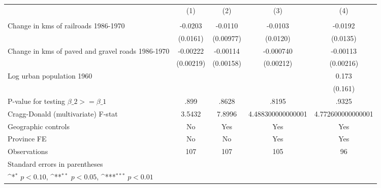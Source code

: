 {
\def\sym#1{\ifmmode^{#1}\else\(^{#1}\)\fi}
\begin{tabular}{l*{4}{c}}
\hline\hline
                &\multicolumn{1}{c}{(1)}&\multicolumn{1}{c}{(2)}&\multicolumn{1}{c}{(3)}&\multicolumn{1}{c}{(4)}\\
                &\multicolumn{1}{c}{}&\multicolumn{1}{c}{}&\multicolumn{1}{c}{}&\multicolumn{1}{c}{}\\
\hline
Change in kms of railroads 1986-1970&  -0.0203         &  -0.0110         &  -0.0103         &  -0.0192         \\
                & (0.0161)         &(0.00977)         & (0.0120)         & (0.0135)         \\
[1em]
Change in kms of paved and gravel roads 1986-1970& -0.00222         & -0.00114         &-0.000740         & -0.00113         \\
                &(0.00219)         &(0.00158)         &(0.00212)         &(0.00216)         \\
[1em]
Log urban population 1960&                  &                  &                  &    0.173         \\
                &                  &                  &                  &  (0.161)         \\
\hline
P-value for testing $\beta\_{2} >= \beta\_{1}$&     .899         &    .8628         &    .8195         &    .9325         \\
Cragg-Donald (multivariate) F-stat&   3.5432         &   7.8996         &4.488300000000001         &4.772600000000001         \\
Geographic controls&       No         &      Yes         &      Yes         &      Yes         \\
Province FE     &       No         &       No         &      Yes         &      Yes         \\
Observations    &      107         &      107         &      105         &       96         \\
\hline\hline
\multicolumn{5}{l}{\footnotesize Standard errors in parentheses}\\
\multicolumn{5}{l}{\footnotesize \sym{*} \(p<0.10\), \sym{**} \(p<0.05\), \sym{***} \(p<0.01\)}\\
\end{tabular}
}
